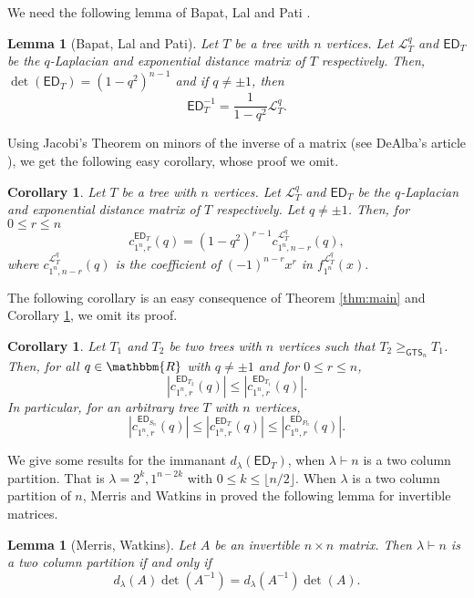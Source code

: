 \documentclass[12pt]{article}
\newtheorem{lemma}[theorem]{Lemma}
\newtheorem{corollary}[theorem]{Corollary}
\newcommand{\ED}{ \mathsf{ED}}
\newcommand{\sL}{  \mathcal{ L}}
\newcommand{\RR}{ \mathbbm{R}}
\newcommand{\nhalf}{\lfloor n/2 \rfloor}
\newcommand{\GTS}{\mathsf{GTS}}
\begin{document}
We need the following lemma of Bapat, Lal and Pati \cite{bapat-lal-pati}. 

\begin{lemma}[Bapat, Lal and Pati]
\label{lem:bapat_E_inverse}
Let $T$ be a tree with $n$ vertices. 
Let $\sL_{T}^q$ and $\ED_T$ be the $q$-Laplacian 
and exponential distance matrix of $T$ respectively. 
Then, $\det(\ED_T) = (1-q^2)^{n-1}$ and 
if $q\neq \pm 1$, then 
$$\ED_T^{-1}=\frac{1}{1-q^2} \sL_{T}^q.$$
\end{lemma}




Using Jacobi's Theorem on minors of the inverse of a matrix
(see DeAlba's article \cite[Section  4.2]{dealba:determinants}),
we get the following easy corollary, whose proof we omit.

\begin{corollary}
\label{cor:our_main_result_2}
Let $T$ be a tree with $n$ vertices. 
Let  $\sL_{T}^q$ and $\ED_T$ be the $q$-Laplacian 
and exponential distance matrix of $T$ respectively. Let $q\neq \pm 1$. 
Then, for $0\leq r \leq n$
 $$c_{1^n,r}^{\ED_{T}}(q)=(1-q^2)^{r-1}c_{1^{n},n-r}^{\sL_{T}^q}(q),$$
 where $c_{1^{n},n-r}^{\sL_{T}^q}(q)$ is the coefficient of 
 $(-1)^{n-r} x^{r}$ in $f_{1^n}^{\sL_{T}^q}(x).$
\end{corollary}

The following corollary is an easy consequence of Theorem \ref{thm:main} 
and  Corollary  \ref{cor:our_main_result_2}, we omit its proof. 

\begin{corollary}
Let $T_1$ and $T_2$ be two trees with $n$ vertices 
such that $T_2 \geq_{\GTS_n} T_1$. Then, for all $q\in \RR$ 
with $q \not= \pm 1$ and for $0\leq r \leq n$,
$$\left|c_{1^n,r}^{\ED_{T_2}}(q)\right| \leq \left|c_{1^n,r}^{\ED_{T_1}}(q)\right|.$$
In particular, for an arbitrary tree $T$ with $n$ vertices,
$$\left|c_{1^n,r}^{\ED_{S_n}}(q)\right| \leq \left|c_{1^n,r}^{\ED_{T}}(q)\right| 
\leq\left|c_{1^n,r}^{\ED_{P_n}}(q)\right|.$$
\end{corollary}

We give some results for  the immanant $d_{\lambda}(\ED_T)$, 
when $\lambda\vdash n$ is a two column partition. 
That is $\lambda=2^k,1^{n-2k}$ with $0 \leq k \leq \nhalf.$  
When $\lambda$ is a two column partition of $n$, 
Merris and Watkins in 
\cite{merris-watkins-ineqs_and_idents}
proved the following lemma for invertible matrices.

\begin{lemma}[Merris, Watkins]
\label{lem:merris_2_col}
Let $A$ be an  invertible $n \times n$  matrix.
Then $\lambda \vdash n$ is a two column partition if and only if 
$$d_{\lambda}(A)\det(A^{-1})=d_{\lambda}(A^{-1})\det(A).$$
\end{lemma} 
\end{document}

